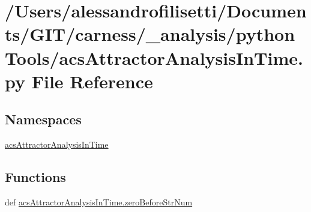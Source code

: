 \hypertarget{a00040}{\section{/\+Users/alessandrofilisetti/\+Documents/\+G\+I\+T/carness/\+\_\+analysis/python\+Tools/acs\+Attractor\+Analysis\+In\+Time.py File Reference}
\label{a00040}
}
\subsection*{Namespaces}
\begin{DoxyCompactItemize}
\item 
 \hyperlink{a00125}{acs\+Attractor\+Analysis\+In\+Time}
\end{DoxyCompactItemize}
\subsection*{Functions}
\begin{DoxyCompactItemize}
\item 
def \hyperlink{a00125_a52efd37e3719214b7a4c7c46842ae229}{acs\+Attractor\+Analysis\+In\+Time.\+zero\+Before\+Str\+Num}
\end{DoxyCompactItemize}
